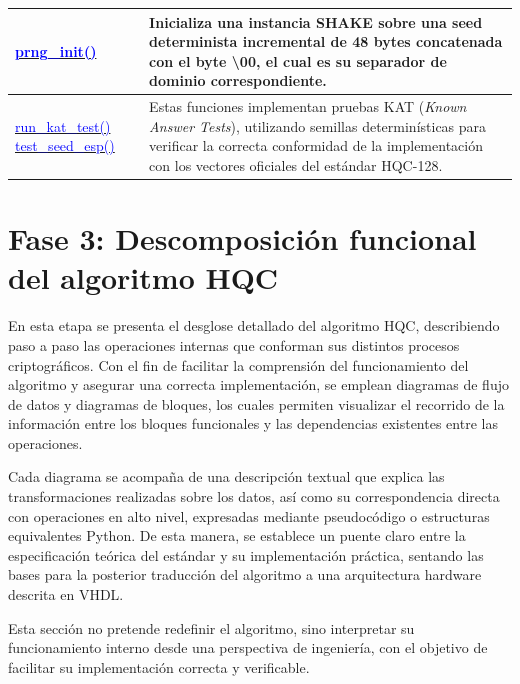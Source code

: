 \begin{longtable}{|>{\centering\arraybackslash}m{4.7cm}|>{\arraybackslash}m{11.9cm}|}
\hline
\href{https://github.com/camilo-home/hqc128/blob/30e4dd2663a1562349b38cff338aa3e4845d5bf5/hqc128.py#L423}{\textcolor{blue}{prng\_init()}} &
Inicializa una instancia SHAKE sobre una seed determinista incremental de 48 bytes concatenada con el byte \textbackslash00, el cual es su separador de dominio correspondiente.
 \\
\hline
\href{https://github.com/camilo-home/hqc128/blob/30e4dd2663a1562349b38cff338aa3e4845d5bf5/hqc128.py#L429}{\textcolor{blue}{run\_kat\_test()}} \href{https://github.com/camilo-home/hqc128/blob/30e4dd2663a1562349b38cff338aa3e4845d5bf5/hqc128.py#L474}{\textcolor{blue}{test\_seed\_esp()}} & Estas funciones implementan pruebas KAT (\textit{Known Answer Tests}), utilizando semillas determinísticas para verificar la correcta conformidad de la implementación con los vectores oficiales del estándar HQC-128.
 \\
\hline
\end{longtable}



\section{Fase 3: Descomposición funcional del algoritmo HQC}

En esta etapa se presenta el desglose detallado del algoritmo HQC, describiendo paso a paso las operaciones internas que conforman sus distintos procesos criptográficos. Con el fin de facilitar la comprensión del funcionamiento del algoritmo y asegurar una correcta implementación, se emplean diagramas de flujo de datos y diagramas de bloques, los cuales permiten visualizar el recorrido de la información entre los bloques funcionales y las dependencias existentes entre las operaciones.

Cada diagrama se acompaña de una descripción textual que explica las transformaciones realizadas sobre los datos, así como su correspondencia directa con operaciones en alto nivel, expresadas mediante pseudocódigo o estructuras equivalentes Python. De esta manera, se establece un puente claro entre la especificación teórica del estándar y su implementación práctica, sentando las bases para la posterior traducción del algoritmo a una arquitectura hardware descrita en VHDL.

Esta sección no pretende redefinir el algoritmo, sino interpretar su funcionamiento interno desde una perspectiva de ingeniería, con el objetivo de facilitar su implementación correcta y verificable.

